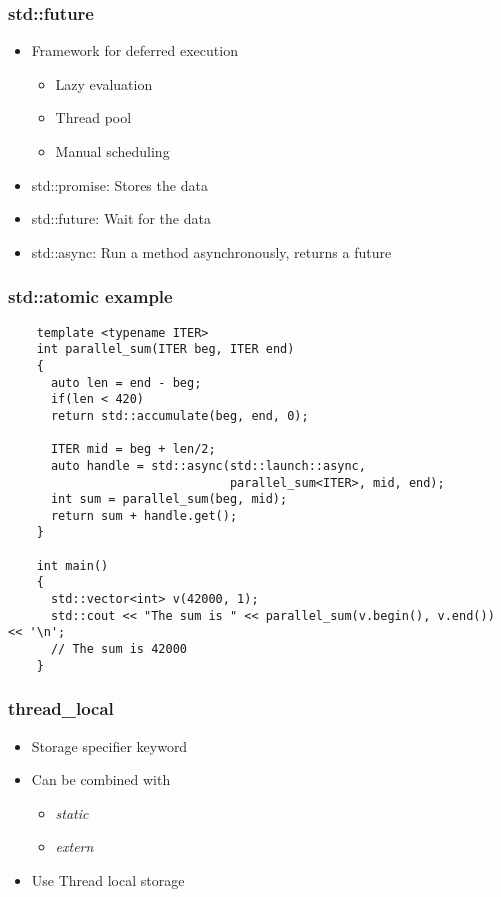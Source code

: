 \begin{frame}
  \frametitle{std::future}

  \begin{itemize}
  \item Framework for deferred execution
    \begin{itemize}
    \item Lazy evaluation
    \item Thread pool
    \item Manual scheduling
    \end{itemize}
  \item std::promise: Stores the data
  \item std::future: Wait for the data
  \item std::async: Run a method asynchronously, returns a future
  \end{itemize}
\end{frame}


\begin{frame}[fragile]
  \frametitle{std::atomic example}

  \begin{verbatim}
    template <typename ITER>
    int parallel_sum(ITER beg, ITER end)
    {
      auto len = end - beg;
      if(len < 420)
      return std::accumulate(beg, end, 0);

      ITER mid = beg + len/2;
      auto handle = std::async(std::launch::async,
                               parallel_sum<ITER>, mid, end);
      int sum = parallel_sum(beg, mid);
      return sum + handle.get();
    }

    int main()
    {
      std::vector<int> v(42000, 1);
      std::cout << "The sum is " << parallel_sum(v.begin(), v.end()) << '\n';
      // The sum is 42000
    }
  \end{verbatim}
\end{frame}


\begin{frame}
  \frametitle{thread\_local}

  \begin{itemize}
  \item Storage specifier keyword
  \item Can be combined with
    \begin{itemize}
    \item \emph{static}
    \item \emph{extern}
    \end{itemize}
  \item Use Thread local storage
  \end{itemize}
\end{frame}






